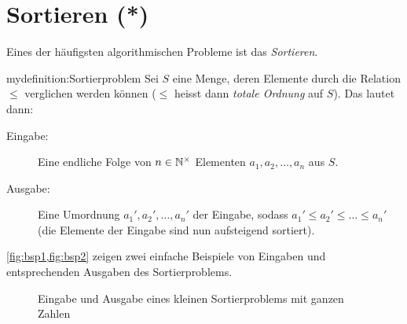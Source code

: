 \chapter{Sortieren (*)}\label{ch:Kapitel05}

Eines der häufigsten algorithmischen Probleme ist das \textit{Sortieren}.
\begin{mydefinition}[Sortierproblem]{mydefinition:Sortierproblem}
Sei $S$ eine Menge, deren Elemente durch die Relation $\leq$ verglichen werden können ($\leq$ heisst dann \textit{totale Ordnung} auf $S$). Das  lautet dann:
\begin{description}
	\item[Eingabe:] Eine endliche Folge von $n\in\mathbb{N}^{\times}$ Elementen $a_1, a_2,\ldots, a_n$ aus $S$.
	\item[Ausgabe:] Eine Umordnung $a_1', a_2', \ldots, a_n'$ der Eingabe, sodass $a_1'\leq a_2' \leq \ldots \leq a_n'$ (die Elemente der Eingabe sind nun aufsteigend sortiert).
\end{description}
\end{mydefinition}
\cref{fig:bsp1,fig:bsp2} zeigen zwei einfache Beispiele von Eingaben und entsprechenden Ausgaben des Sortierproblems.

\begin{figure}[H]
	\def\lvld{1.2}                  %
	\pgfmathsetmacro\shft{-6*\lvld} %
	\centering
	\caption{Eingabe und Ausgabe eines kleinen Sortierproblems mit ganzen Zahlen}
	\label{fig:bsp1}
\end{figure}

